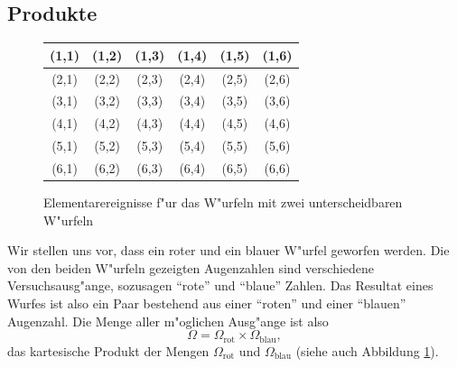 \subsection{Produkte}
\begin{figure}
\begin{center}
\begin{tabular}{|c|c|c|c|c|c|}
\hline
(1,1)&(1,2)&(1,3)&(1,4)&(1,5)&(1,6)\\
\hline
(2,1)&(2,2)&(2,3)&(2,4)&(2,5)&(2,6)\\
\hline
(3,1)&(3,2)&(3,3)&(3,4)&(3,5)&(3,6)\\
\hline
(4,1)&(4,2)&(4,3)&(4,4)&(4,5)&(4,6)\\
\hline
(5,1)&(5,2)&(5,3)&(5,4)&(5,5)&(5,6)\\
\hline
(6,1)&(6,2)&(6,3)&(6,4)&(6,5)&(6,6)\\
\hline
\end{tabular}
\end{center}
\caption{Elementarereignisse f"ur das W"urfeln mit zwei unterscheidbaren
W"urfeln\label{ereignisse-zwei-wuerfel}}
\end{figure}
Wir stellen uns vor, dass ein roter und ein blauer W"urfel geworfen werden.
Die von den beiden W"urfeln gezeigten Augenzahlen sind verschiedene
Versuchsausg"ange, sozusagen ``rote'' und ``blaue'' Zahlen.
Das Resultat
eines Wurfes ist also ein Paar bestehend aus einer ``roten'' und
einer ``blauen'' Augenzahl.
Die Menge aller m"oglichen Ausg"ange
ist also 
\[
\Omega = \Omega_{\text{rot}}\times\Omega_{\text{blau}},
\]
das kartesische Produkt der Mengen $\Omega_{\text{rot}}$ und
$\Omega_{\text{blau}}$ (siehe auch Abbildung \ref{ereignisse-zwei-wuerfel}).

